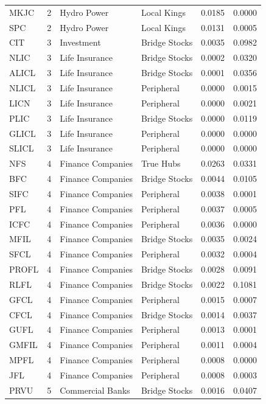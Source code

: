 \begin{longtable}{l r l l r r}
MKJC & 2 & Hydro Power & Local Kings & 0.0185 & 0.0000 \\
SPC & 2 & Hydro Power & Local Kings & 0.0131 & 0.0005 \\
CIT & 3 & Investment & Bridge Stocks & 0.0035 & 0.0982 \\
NLIC & 3 & Life Insurance & Bridge Stocks & 0.0002 & 0.0320 \\
ALICL & 3 & Life Insurance & Bridge Stocks & 0.0001 & 0.0356 \\
NLICL & 3 & Life Insurance & Peripheral & 0.0000 & 0.0015 \\
LICN & 3 & Life Insurance & Peripheral & 0.0000 & 0.0021 \\
PLIC & 3 & Life Insurance & Bridge Stocks & 0.0000 & 0.0119 \\
GLICL & 3 & Life Insurance & Peripheral & 0.0000 & 0.0000 \\
SLICL & 3 & Life Insurance & Peripheral & 0.0000 & 0.0000 \\
NFS & 4 & Finance Companies & True Hubs & 0.0263 & 0.0331 \\
BFC & 4 & Finance Companies & Bridge Stocks & 0.0044 & 0.0105 \\
SIFC & 4 & Finance Companies & Peripheral & 0.0038 & 0.0001 \\
PFL & 4 & Finance Companies & Peripheral & 0.0037 & 0.0005 \\
ICFC & 4 & Finance Companies & Peripheral & 0.0036 & 0.0000 \\
MFIL & 4 & Finance Companies & Bridge Stocks & 0.0035 & 0.0024 \\
SFCL & 4 & Finance Companies & Peripheral & 0.0032 & 0.0004 \\
PROFL & 4 & Finance Companies & Bridge Stocks & 0.0028 & 0.0091 \\
RLFL & 4 & Finance Companies & Bridge Stocks & 0.0022 & 0.1081 \\
GFCL & 4 & Finance Companies & Peripheral & 0.0015 & 0.0007 \\
CFCL & 4 & Finance Companies & Bridge Stocks & 0.0014 & 0.0037 \\
GUFL & 4 & Finance Companies & Peripheral & 0.0013 & 0.0001 \\
GMFIL & 4 & Finance Companies & Peripheral & 0.0011 & 0.0004 \\
MPFL & 4 & Finance Companies & Peripheral & 0.0008 & 0.0000 \\
JFL & 4 & Finance Companies & Peripheral & 0.0008 & 0.0003 \\
PRVU & 5 & Commercial Banks & Bridge Stocks & 0.0016 & 0.0407 \\

\end{longtable}
